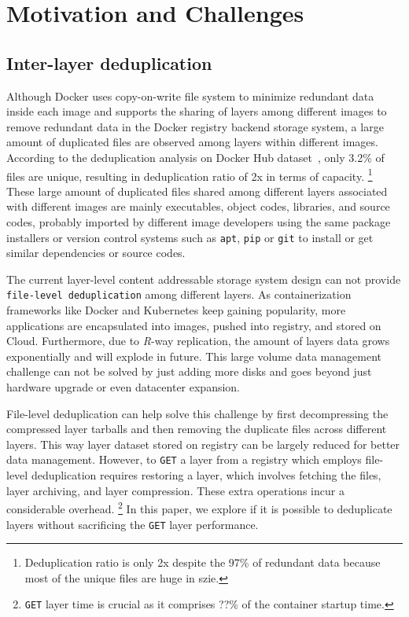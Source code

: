 \section{Motivation and Challenges}
\label{sec:dataset-analysis}

\subsection{Inter-layer deduplication} Although Docker uses copy-on-write file
system to minimize redundant data inside each image and supports the sharing of
layers among different images to remove redundant data in the Docker registry
backend storage system, a large amount of duplicated files are observed among
layers within different images.
%
According to the deduplication analysis on Docker Hub
dataset~\cite{dedupanalysis}, only 3.2\% of files are unique, resulting in
deduplication ratio of 2x in terms of capacity.
%
\footnote{Deduplication ratio is only 2x despite the 97\% of redundant data
because most of the unique files are huge in szie.} 
%
These large amount of duplicated files shared among different layers associated
with different images are mainly executables, object codes, libraries, and
source codes, probably imported by different image developers using the same
package installers or version control systems such as \texttt{apt},
\texttt{pip} or \texttt{git} to install or get similar dependencies or source
codes.  

The current layer-level content addressable storage system design can not
provide \texttt{file-level deduplication} among different layers.
%
As containerization frameworks like Docker and Kubernetes keep gaining
popularity, more applications are encapsulated into images, pushed into
registry, and stored on Cloud.
%
Furthermore, due to \emph{R}-way replication, the amount of layers data grows
exponentially and will explode in future.
%
This large volume data management challenge can not be solved by just adding
more disks and goes beyond just hardware upgrade or even datacenter expansion.
 
File-level deduplication can help solve this challenge by first decompressing
the compressed layer tarballs and then removing the duplicate files across
different layers.
%
This way layer dataset stored on registry can be largely reduced for better
data management.
%
However, to \texttt{GET} a layer from a registry which employs file-level
deduplication requires restoring a layer, which involves fetching the files,
layer archiving, and layer compression.
%
These extra operations incur a considerable overhead. \footnote{\texttt{GET}
layer time is crucial as it comprises ??\% of the container startup time.}
%
In this paper, we explore if it is possible to deduplicate layers without
sacrificing the \texttt{GET} layer performance.
%   

